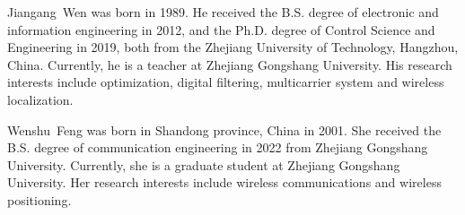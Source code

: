 \documentclass[journal]{IEEEtran}
\begin{document}
%









\begin{IEEEbiography}
   				                                          {Jiangang~Wen}
    was born
   in 1989. He received the B.S. degree of electronic and information engineering in 2012, and the
   Ph.D. degree of Control Science and Engineering
   in 2019, both from the Zhejiang University of
   Technology, Hangzhou, China. Currently, he is
   a teacher at Zhejiang Gongshang University. His
   research interests include optimization, digital
   filtering, multicarrier system and wireless localization.
   \end{IEEEbiography}
   


   \begin{IEEEbiography}
                  {Wenshu~Feng}
      was born in Shandong province, China in 2001. She received the B.S. degree of communication engineering in 2022 from Zhejiang Gongshang University. Currently, she is a graduate student at Zhejiang Gongshang University. Her research interests include wireless communications and wireless positioning.
      \end{IEEEbiography}
\end{document}
